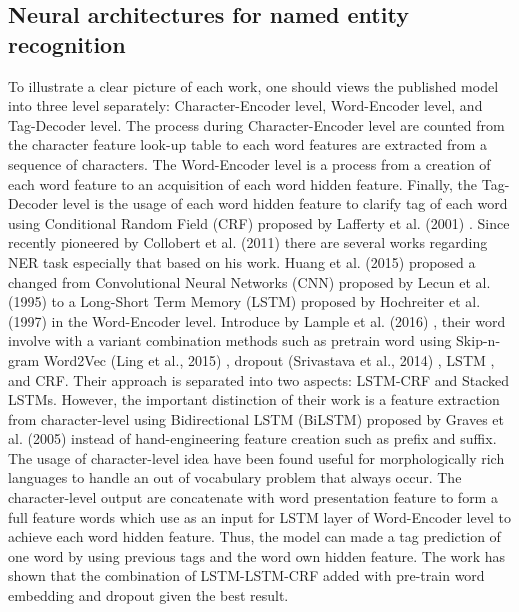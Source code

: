 \subsection{Neural architectures for named entity recognition}
To illustrate a clear picture of each work, one should views the published model into three level separately: Character-Encoder level, Word-Encoder level, and Tag-Decoder level.
The process during Character-Encoder level are counted from the character feature look-up table to each word features are extracted from a sequence of characters.
The Word-Encoder level is a process from a creation of each word feature to an acquisition of each word hidden feature.
Finally, the Tag-Decoder level is the usage of each word hidden feature to clarify tag of each word using Conditional Random Field (CRF) proposed by Lafferty et al. (2001) \cite{Lafferty:2001:CRF:645530.655813}.
Since recently pioneered by Collobert et al. (2011) \cite{DBLP:journals/corr/abs-1103-0398} there are several works regarding NER task especially that based on his work. Huang et al. (2015) \cite{DBLP:journals/corr/HuangXY15} proposed a changed from Convolutional Neural Networks (CNN) proposed by Lecun et al. (1995) \cite{lecun1995convolutional} to a Long-Short Term Memory (LSTM) proposed by Hochreiter et al. (1997) \cite{DBLP:journals/neco/HochreiterS97} in the Word-Encoder level.
Introduce by Lample et al. (2016) \cite{DBLP:journals/corr/LampleBSKD16}, their word involve with a variant combination methods such as pretrain word using Skip-n-gram Word2Vec (Ling et al., 2015) \cite{DBLP:journals/corr/LingLMAADBT15}, dropout (Srivastava et al., 2014) \cite{JMLR:v15:srivastava14a}, LSTM , and CRF.
Their approach is separated into two aspects: LSTM-CRF and Stacked LSTMs.
However, the important distinction of their work is a feature extraction from character-level using Bidirectional LSTM (BiLSTM) proposed by Graves et al. (2005) \cite{graves2005framewise} instead of hand-engineering feature creation such as prefix and suffix.
The usage of character-level idea have been found useful for morphologically rich languages to handle an out of vocabulary problem that always occur.
The character-level output are concatenate with word presentation feature to form a full feature words which use as an input for LSTM layer of Word-Encoder level to achieve each word hidden feature.
Thus, the model can made a tag prediction of one word by using previous tags and the word own hidden feature.
The work has shown that the combination of LSTM-LSTM-CRF added with pre-train word embedding and dropout given the best result.
